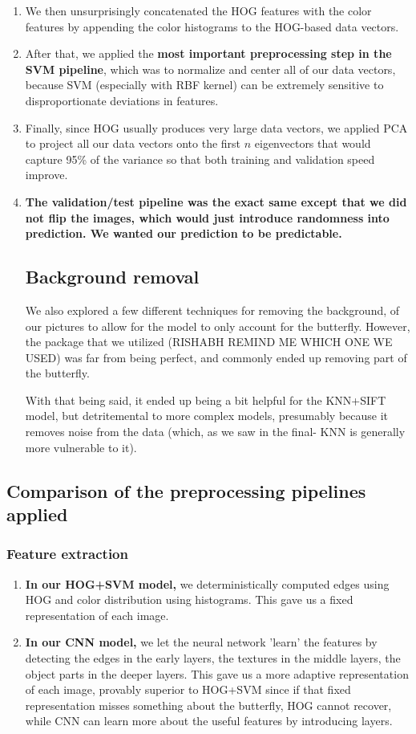 \documentclass[10pt]{article} %
\begin{document}
\begin{enumerate}
    \item We then unsurprisingly concatenated the HOG features with the color features by appending the color histograms to the HOG-based data vectors.
    \item After that, we applied the \textbf{most important preprocessing step in the SVM pipeline}, which was to normalize and center all of our data vectors, because SVM (especially with RBF kernel) can be extremely sensitive to disproportionate deviations in features.
    \item Finally, since HOG usually produces very large data vectors, we applied PCA to project all our data vectors onto the first $n$ eigenvectors that would capture 95\% of the variance so that both training and validation speed improve.
    \item \textbf{The validation/test pipeline was the exact same except that we did not flip the images, which would just introduce randomness into prediction. We wanted our prediction to be predictable.}
    \subsection{Background removal}
    We also explored a few different techniques for removing the background, of our pictures to allow for the model to only account for the butterfly. However, the package that we utilized (RISHABH REMIND ME WHICH ONE WE USED) was far from being perfect, and commonly ended up removing part of the butterfly. \par
    With that being said, it ended up being a bit helpful for the KNN+SIFT model, but detritemental to more complex models, presumably because it removes noise from the data (which, as we saw in the final- KNN is generally more vulnerable to it). \par
\end{enumerate}
\subsection{Comparison of the preprocessing pipelines applied}
\subsubsection{Feature extraction}\begin{enumerate}
    \item \textbf{In our HOG+SVM model,} we deterministically computed edges using HOG and color distribution using histograms. This gave us a fixed representation of each image.
    \item \textbf{In our CNN model,} we let the neural network 'learn' the features by detecting the edges in the early layers, the textures in the middle layers, the object parts in the deeper layers. This gave us a more adaptive representation of each image, provably superior to HOG+SVM since if that fixed representation misses something about the butterfly, HOG cannot recover, while CNN can learn more about the useful features by introducing layers.
\end{enumerate}
\end{document}

